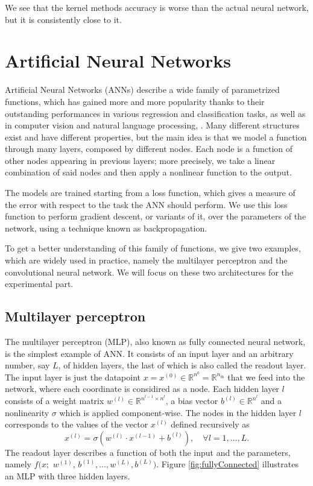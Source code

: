\documentclass[11pt,notitlepage]{article}
\numberwithin{equation}{section}
\def\R{{\mathbb{R}}}
\theoremstyle{remark}
\theoremstyle{definition}
\begin{document}
	We see that the kernel methods accuracy is worse than the actual neural network, but it is consistently close to it.
	
	
	\section{Artificial Neural Networks}
	Artificial Neural Networks (ANNs) describe a wide family of parametrized functions, which has gained more and more popularity thanks to their outstanding performances in various regression and classification tasks, as well as in computer vision and natural language processing, \cite{fleuret2019deep}.
	Many different structures exist and have different properties, but the main idea is that we model a function through many layers, composed by different nodes.
	Each node is a function of other nodes appearing in previous layers; more precisely, we take a linear combination of said nodes and then apply a nonlinear function to the output.
	
	The models are trained starting from a loss function, which gives a measure of the error with respect to the task the ANN should perform.
	We use this loss function to perform gradient descent, or variants of it, over the parameters of the network, using a technique known as backpropagation.
	
	To get a better understanding of this family of functions, we give two examples, which are widely used in practice, namely the multilayer perceptron and the convolutional neural network.
	We will focus on these two architectures for the experimental part.
	
	\subsection{Multilayer perceptron}
	The multilayer perceptron (MLP), also known as fully connected neural network, is the simplest example of ANN.
	It consists of an input layer and an arbitrary number, say $L$, of hidden layers, the last of which is also called the readout layer.
	The input layer is just the datapoint $x = x^{(0)} \in \R^{n^0} = \R^{n_{\text{in}}}$ that we feed into the network, where each coordinate is considired as a node.
	Each hidden layer $l$ consists of a weight matrix $w^{(l)} \in \R^{n^{l-1} \times n^l}$, a bias vector $b^{(l)} \in \R^{n^l}$ and a nonlinearity $\sigma$ which is applied component-wise.
	The nodes in the hidden layer $l$ corresponds to the values of the vector $x^{(l)}$ defined recursively as
	\begin{equation}
	x^{(l)} = \sigma(w^{(l)} \cdot x^{(l-1)} + b^{(l)}), \quad \forall l = 1, \dots, L.
	\end{equation}
	The readout layer describes a function of both the input and the parameters, namely $f(x;$ $w^{(1)}$, $b^{(1)}, \dots, w^{(L)}, b^{(L)})$.
	Figure \ref{fig:fullyConnected} illustrates an MLP with three hidden layers.
	
\end{document}
